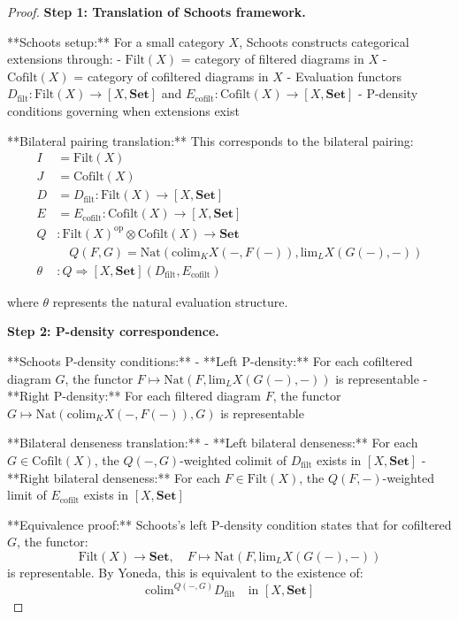 \documentclass[11pt]{article}
\theoremstyle{plain}
\theoremstyle{definition}
\theoremstyle{remark}
\newcommand{\op}{\mathrm{op}}
\newcommand{\colim}{\mathrm{colim}}
\renewcommand{\lim}{\mathrm{lim}}
\begin{document}
\begin{proof}
\textbf{Step 1: Translation of Schoots framework.}

**Schoots setup:** For a small category $X$, Schoots constructs categorical extensions through:
- $\text{Filt}(X)$ = category of filtered diagrams in $X$
- $\text{Cofilt}(X)$ = category of cofiltered diagrams in $X$
- Evaluation functors $D_{\text{filt}} : \text{Filt}(X) \to [X, \mathbf{Set}]$ and $E_{\text{cofilt}} : \text{Cofilt}(X) \to [X, \mathbf{Set}]$
- P-density conditions governing when extensions exist

**Bilateral pairing translation:** This corresponds to the bilateral pairing:
\begin{align}
I &= \text{Filt}(X) \\
J &= \text{Cofilt}(X) \\
D &= D_{\text{filt}} : \text{Filt}(X) \to [X, \mathbf{Set}] \\
E &= E_{\text{cofilt}} : \text{Cofilt}(X) \to [X, \mathbf{Set}] \\
Q &: \text{Filt}(X)^{\op} \otimes \text{Cofilt}(X) \to \mathbf{Set} \\
&\quad Q(F, G) = \text{Nat}(\colim_K X(-, F(-)), \lim_L X(G(-), -)) \\
\theta &: Q \Rightarrow [X, \mathbf{Set}](D_{\text{filt}}, E_{\text{cofilt}})
\end{align}

where $\theta$ represents the natural evaluation structure.

\textbf{Step 2: P-density correspondence.}

**Schoots P-density conditions:**
- **Left P-density:** For each cofiltered diagram $G$, the functor $F \mapsto \text{Nat}(F, \lim_L X(G(-), -))$ is representable
- **Right P-density:** For each filtered diagram $F$, the functor $G \mapsto \text{Nat}(\colim_K X(-, F(-)), G)$ is representable

**Bilateral denseness translation:**
- **Left bilateral denseness:** For each $G \in \text{Cofilt}(X)$, the $Q(-, G)$-weighted colimit of $D_{\text{filt}}$ exists in $[X, \mathbf{Set}]$
- **Right bilateral denseness:** For each $F \in \text{Filt}(X)$, the $Q(F, -)$-weighted limit of $E_{\text{cofilt}}$ exists in $[X, \mathbf{Set}]$

**Equivalence proof:** 
Schoots's left P-density condition states that for cofiltered $G$, the functor:
$$\text{Filt}(X) \to \mathbf{Set}, \quad F \mapsto \text{Nat}(F, \lim_L X(G(-), -))$$
is representable. By Yoneda, this is equivalent to the existence of:
$$\colim^{Q(-, G)} D_{\text{filt}} \quad \text{in } [X, \mathbf{Set}]$$


\end{proof}
\end{document}
